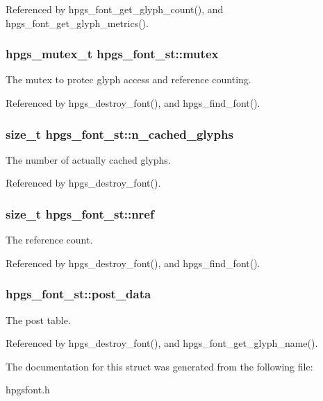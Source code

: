 Referenced by hpgs\_\-font\_\-get\_\-glyph\_\-count(), and hpgs\_\-font\_\-get\_\-glyph\_\-metrics().

\subsubsection[{mutex}]{\setlength{\rightskip}{0pt plus 5cm}hpgs\_\-mutex\_\-t {\bf hpgs\_\-font\_\-st::mutex}}\label{structhpgs__font__st_ac38d24f9286f4d3b46a38a5b1500e541}
The mutex to protec glyph access and reference counting. 

Referenced by hpgs\_\-destroy\_\-font(), and hpgs\_\-find\_\-font().

\subsubsection[{n\_\-cached\_\-glyphs}]{\setlength{\rightskip}{0pt plus 5cm}size\_\-t {\bf hpgs\_\-font\_\-st::n\_\-cached\_\-glyphs}}\label{structhpgs__font__st_a2d8d4de9fb54a237d12221e93da80ee8}
The number of actually cached glyphs. 

Referenced by hpgs\_\-destroy\_\-font().

\subsubsection[{nref}]{\setlength{\rightskip}{0pt plus 5cm}size\_\-t {\bf hpgs\_\-font\_\-st::nref}}\label{structhpgs__font__st_a62615189edb7935d10248a065caae62b}
The reference count. 

Referenced by hpgs\_\-destroy\_\-font(), and hpgs\_\-find\_\-font().

\subsubsection[{post\_\-data}]{ {\bf hpgs\_\-font\_\-st::post\_\-data}}\label{structhpgs__font__st_ae75403174e964ab5c13cbf25c351ab20}
The post table. 

Referenced by hpgs\_\-destroy\_\-font(), and hpgs\_\-font\_\-get\_\-glyph\_\-name().



The documentation for this struct was generated from the following file:\begin{DoxyCompactItemize}
\item 
hpgsfont.h\end{DoxyCompactItemize}
